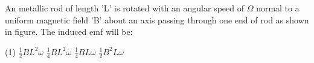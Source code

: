 \item An metallic rod of length 'L' is rotated with an angular speed of $\Omega$ normal to a uniform magnetic field 'B' about an axis passing through one end of rod as shown in figure. The induced emf will be:
    \begin{center}
    \end{center}
    \begin{tasks}(1)
        \task $\frac{1}{2} BL^2 \omega$
        \task $\frac{1}{4} BL^2 \omega$
        \task $\frac{1}{4} B L \omega$
        \task $\frac{1}{2} B^2 L \omega$
    \end{tasks}